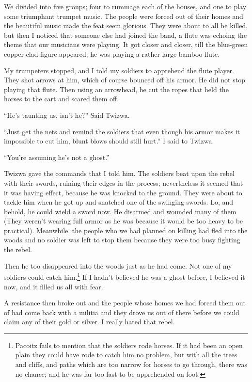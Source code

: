 We divided into five groups; four to rummage each of the houses, and one to play some triumphant trumpet music.
The people were forced out of their homes and the beautiful music made the feat seem glorious. They were about to all be killed, but then I noticed that someone else had joined the band, a flute was echoing the theme that our musicians were playing. It got closer and closer, till the blue-green copper clad figure appeared; he was playing a rather large bamboo flute.

My trumpeters stopped, and I told my soldiers to apprehend the flute player. They shot arrows at him, which of course bounced off his armor. He did not stop playing that flute. Then using an arrowhead, he cut the ropes that held the horses to the cart and scared them off.

``He's taunting us, isn't he?'' Said Twizwa.

``Just get the nets and remind the soldiers that even though his armor makes it impossible to cut him, blunt blows should still hurt.'' I said to Twizwa.

``You're assuming he's not a ghost.''

Twizwa gave the commands that I told him. The soldiers beat upon the rebel with their swords, ruining their edges in the process; nevertheless it seemed that it was having effect, because he was knocked to the ground. They were about to tackle him when he got up and snatched one of the swinging swords. Lo, and behold, he could wield a sword now. He disarmed and wounded many of them (They weren't wearing full armor as he was because it would be too heavy to be practical). Meanwhile, the people who we had planned on killing had fled into the woods and no soldier was left to stop them because they were too busy fighting the rebel.

Then he too disappeared into the woods just as he had come. Not one of my soldiers could catch him.\footnote{Pacoitz fails to mention that the soldiers rode horses. If it had been an open plain they could have rode to catch him no problem, but with all the trees and cliffs, and paths which are too narrow for horses to go through, there was no chance; and he was far too fast to be apprehended on foot.} If I hadn't believed he was a ghost before, I believed it now, and it filled us all with fear.

A resistance then broke out and the people whose homes we had forced them out of had come back with a militia and they drove us out of there before we could claim any of their gold or silver. I really hated that rebel.


